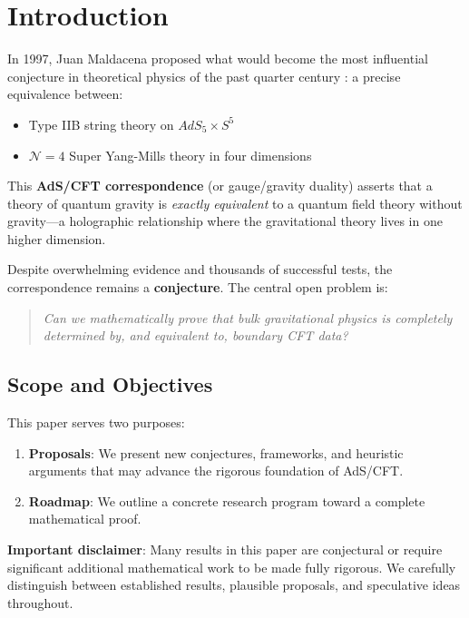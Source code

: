 \documentclass[12pt,a4paper]{article}
\begin{document}
\tableofcontents
\newpage

\section{Introduction}

In 1997, Juan Maldacena proposed what would become the most influential conjecture in theoretical physics of the past quarter century \cite{maldacena1999}: a precise equivalence between:
\begin{itemize}
    \item Type IIB string theory on $AdS_5 \times S^5$
    \item $\mathcal{N}=4$ Super Yang-Mills theory in four dimensions
\end{itemize}

This \textbf{AdS/CFT correspondence} (or gauge/gravity duality) asserts that a theory of quantum gravity is \textit{exactly equivalent} to a quantum field theory without gravity---a holographic relationship where the gravitational theory lives in one higher dimension.

Despite overwhelming evidence and thousands of successful tests, the correspondence remains a \textbf{conjecture}. The central open problem is:

\begin{quote}
\textit{Can we mathematically prove that bulk gravitational physics is completely determined by, and equivalent to, boundary CFT data?}
\end{quote}

\subsection{Scope and Objectives}

This paper serves two purposes:
\begin{enumerate}
    \item \textbf{Proposals}: We present new conjectures, frameworks, and heuristic arguments that may advance the rigorous foundation of AdS/CFT.
    \item \textbf{Roadmap}: We outline a concrete research program toward a complete mathematical proof.
\end{enumerate}

\textbf{Important disclaimer}: Many results in this paper are conjectural or require significant additional mathematical work to be made fully rigorous. We carefully distinguish between established results, plausible proposals, and speculative ideas throughout.
\end{document}
